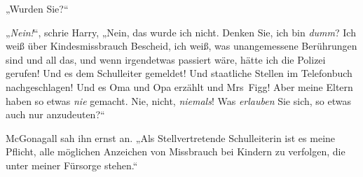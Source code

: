 „Wurden Sie?“

„\emph{Nein!}“, schrie Harry, „Nein, das wurde ich nicht. Denken Sie, ich bin \emph{dumm}? Ich weiß über Kindesmissbrauch Bescheid, ich weiß, was unangemessene Berührungen sind und all das, und wenn irgendetwas passiert wäre, hätte ich die Polizei gerufen! Und es dem Schulleiter gemeldet! Und staatliche Stellen im Telefonbuch nachgeschlagen! Und es Oma und Opa erzählt und Mrs~Figg! Aber meine Eltern haben so etwas \emph{nie} gemacht. Nie, nicht, \emph{niemals}! Was \emph{erlauben} Sie sich, so etwas auch nur anzudeuten?“

McGonagall sah ihn ernst an. „Als Stellvertretende Schulleiterin ist es meine Pflicht, alle möglichen Anzeichen von Missbrauch bei Kindern zu verfolgen, die unter meiner Fürsorge stehen.“

